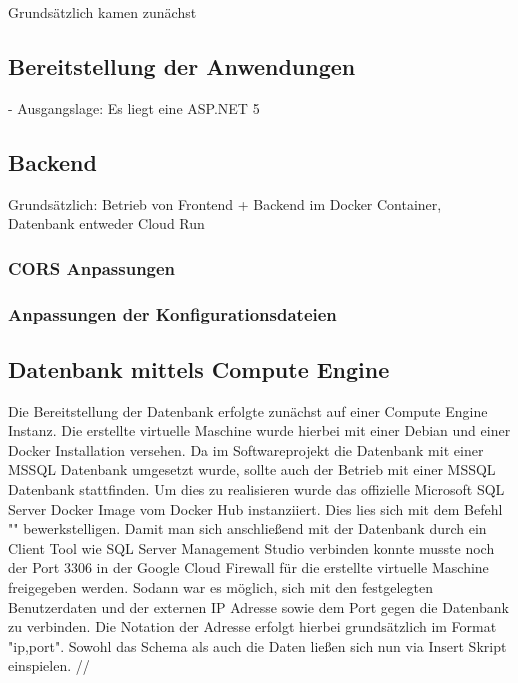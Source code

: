 \documentclass[pdftex,a4paper,abstracton,11pt,parskip=half,bibtotocnumbered]{scrartcl}
\begin{document}
	Grundsätzlich kamen zunächst  
	\subsection{Bereitstellung der Anwendungen}
		- Ausgangslage: Es liegt eine ASP.NET 5 
	

	\subsection{Backend}
	Grundsätzlich: Betrieb von Frontend + Backend im Docker Container, Datenbank entweder 
	Cloud Run
	\subsubsection{CORS Anpassungen}
	\subsubsection{Anpassungen der Konfigurationsdateien}
	
	\subsection{Datenbank mittels Compute Engine}
		Die Bereitstellung der Datenbank erfolgte zunächst auf einer Compute Engine Instanz. Die erstellte virtuelle Maschine wurde hierbei mit einer Debian und einer Docker Installation versehen. Da im Softwareprojekt die Datenbank mit einer MSSQL Datenbank umgesetzt wurde, sollte auch der Betrieb mit einer MSSQL Datenbank stattfinden. Um dies zu realisieren wurde das offizielle Microsoft SQL Server Docker Image vom Docker Hub instanziiert. Dies lies sich mit dem Befehl "" bewerkstelligen. Damit man sich anschließend mit der Datenbank durch ein Client Tool wie SQL Server Management Studio verbinden konnte musste noch der Port 3306 in der Google Cloud Firewall für die erstellte virtuelle Maschine freigegeben werden. Sodann war es möglich, sich mit den festgelegten Benutzerdaten und der externen IP Adresse sowie dem Port gegen die Datenbank zu verbinden. Die Notation der Adresse erfolgt hierbei grundsätzlich im Format "ip,port". Sowohl das Schema als auch die Daten ließen sich nun via Insert Skript einspielen. //
		
\end{document}
